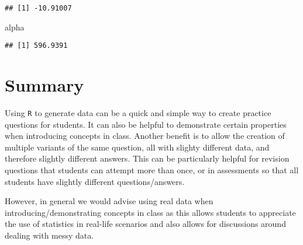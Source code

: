 \documentclass[
]{book}
\newenvironment{Shaded}{\begin{snugshade}}{\end{snugshade}}
\newcommand{\NormalTok}[1]{#1}
\begin{document}
\begin{verbatim}
## [1] -10.91007
\end{verbatim}

\begin{Shaded}
\begin{Highlighting}[]
\NormalTok{alpha}
\end{Highlighting}
\end{Shaded}

\begin{verbatim}
## [1] 596.9391
\end{verbatim}

\hypertarget{summary}{%
\section{Summary}\label{summary}}

Using \texttt{R} to generate data can be a quick and simple way to create practice questions for students. It can also be helpful to demonstrate certain properties when introducing concepts in class. Another benefit is to allow the creation of multiple variants of the same question, all with slighty different data, and therefore slightly different answers. This can be particularly helpful for revision questions that students can attempt more than once, or in assessments so that all students have slightly different questions/answers.

However, in general we would advise using real data when introducing/demonstrating concepts in class as this allows students to appreciate the use of statistics in real-life scenarios and also allows for discussions around dealing with messy data.

  
\end{document}
